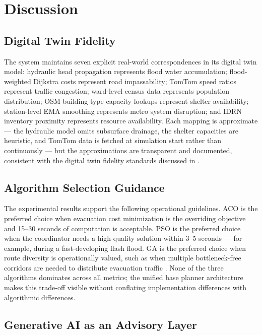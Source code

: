 \documentclass[journal]{IEEEtran}
\begin{document}
\section{Discussion}
\label{sec:discussion}

\subsection{Digital Twin Fidelity}

The system maintains seven explicit real-world correspondences in its digital twin model:
hydraulic head propagation represents flood water accumulation; flood-weighted Dijkstra
costs represent road impassability; TomTom speed ratios represent traffic congestion;
ward-level census data represents population distribution; OSM building-type capacity
lookups represent shelter availability; station-level EMA smoothing represents metro system
disruption; and IDRN inventory proximity represents resource availability. Each mapping is
approximate — the hydraulic model omits subsurface drainage, the shelter capacities are
heuristic, and TomTom data is fetched at simulation start rather than continuously — but
the approximations are transparent and documented, consistent with the digital twin
fidelity standards discussed in \cite{mandal2025cityscale, riaz2023climate}.

\subsection{Algorithm Selection Guidance}

The experimental results support the following operational guidelines. ACO is the preferred
choice when evacuation cost minimization is the overriding objective and 15--30 seconds of
computation is acceptable. PSO is the preferred choice when the coordinator needs a
high-quality solution within 3--5 seconds — for example, during a fast-developing flash
flood. GA is the preferred choice when route diversity is operationally valued, such as
when multiple bottleneck-free corridors are needed to distribute evacuation traffic
\cite{yin2025overview}. None of the three algorithms dominates across all metrics; the
unified base planner architecture makes this trade-off visible without conflating
implementation differences with algorithmic differences.

\subsection{Generative AI as an Advisory Layer}
\end{document}
